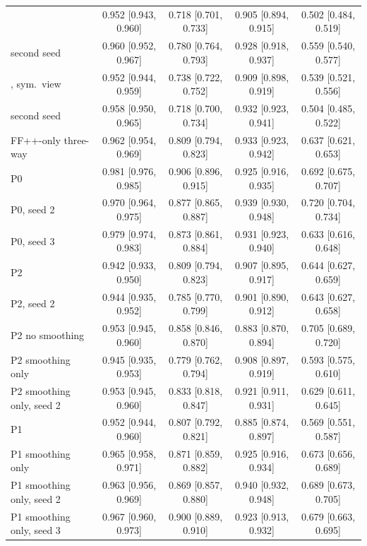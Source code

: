 \begin{tabular}{@{}l cccc@{}}
\oursF{} & 0.952 [0.943, 0.960] & 0.718 [0.701, 0.733] & 0.905 [0.894, 0.915] & 0.502 [0.484, 0.519] \\
\quad second seed & 0.960 [0.952, 0.967] & 0.780 [0.764, 0.793] & 0.928 [0.918, 0.937] & 0.559 [0.540, 0.577] \\
\oursF{}, sym.\ view & 0.952 [0.944, 0.959] & 0.738 [0.722, 0.752] & 0.909 [0.898, 0.919] & 0.539 [0.521, 0.556] \\
\quad second seed & 0.958 [0.950, 0.965] & 0.718 [0.700, 0.734] & 0.932 [0.923, 0.941] & 0.504 [0.485, 0.522] \\
FF++-only three-way & 0.962 [0.954, 0.969] & 0.809 [0.794, 0.823] & 0.933 [0.923, 0.942] & 0.637 [0.621, 0.653] \\
\quad P0 & 0.981 [0.976, 0.985] & 0.906 [0.896, 0.915] & 0.925 [0.916, 0.935] & 0.692 [0.675, 0.707] \\
\quad P0, seed 2 & 0.970 [0.964, 0.975] & 0.877 [0.865, 0.887] & 0.939 [0.930, 0.948] & 0.720 [0.704, 0.734] \\
\quad P0, seed 3 & 0.979 [0.974, 0.983] & 0.873 [0.861, 0.884] & 0.931 [0.923, 0.940] & 0.633 [0.616, 0.648] \\
\quad P2 & 0.942 [0.933, 0.950] & 0.809 [0.794, 0.823] & 0.907 [0.895, 0.917] & 0.644 [0.627, 0.659] \\
\quad P2, seed 2 & 0.944 [0.935, 0.952] & 0.785 [0.770, 0.799] & 0.901 [0.890, 0.912] & 0.643 [0.627, 0.658] \\
\quad P2 no smoothing & 0.953 [0.945, 0.960] & 0.858 [0.846, 0.870] & 0.883 [0.870, 0.894] & 0.705 [0.689, 0.720] \\
\quad P2 smoothing only & 0.945 [0.935, 0.953] & 0.779 [0.762, 0.794] & 0.908 [0.897, 0.919] & 0.593 [0.575, 0.610] \\
\quad P2 smoothing only, seed 2 & 0.953 [0.945, 0.960] & 0.833 [0.818, 0.847] & 0.921 [0.911, 0.931] & 0.629 [0.611, 0.645] \\
\quad P1 & 0.952 [0.944, 0.960] & 0.807 [0.792, 0.821] & 0.885 [0.874, 0.897] & 0.569 [0.551, 0.587] \\
\quad P1 smoothing only & 0.965 [0.958, 0.971] & 0.871 [0.859, 0.882] & 0.925 [0.916, 0.934] & 0.673 [0.656, 0.689] \\
\quad P1 smoothing only, seed 2 & 0.963 [0.956, 0.969] & 0.869 [0.857, 0.880] & 0.940 [0.932, 0.948] & 0.689 [0.673, 0.705] \\
\quad P1 smoothing only, seed 3 & 0.967 [0.960, 0.973] & 0.900 [0.889, 0.910] & 0.923 [0.913, 0.932] & 0.679 [0.663, 0.695] \\

\end{tabular}

